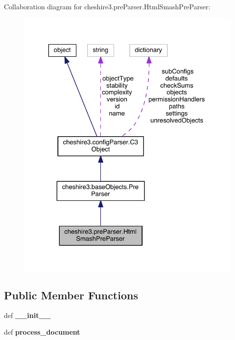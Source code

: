 Collaboration diagram for cheshire3.\-pre\-Parser.\-Html\-Smash\-Pre\-Parser\-:
\nopagebreak
\begin{figure}[H]
\begin{center}
\leavevmode
\includegraphics[width=325pt]{classcheshire3_1_1pre_parser_1_1_html_smash_pre_parser__coll__graph}
\end{center}
\end{figure}
\subsection*{Public Member Functions}
\begin{DoxyCompactItemize}
\item 
\hypertarget{classcheshire3_1_1pre_parser_1_1_html_smash_pre_parser_aaf28723a3045ac67f35668ead04bab39}{def {\bfseries \-\_\-\-\_\-init\-\_\-\-\_\-}}\label{classcheshire3_1_1pre_parser_1_1_html_smash_pre_parser_aaf28723a3045ac67f35668ead04bab39}

\item 
\hypertarget{classcheshire3_1_1pre_parser_1_1_html_smash_pre_parser_af06af59a09f336f375f01598a8fc3e8b}{def {\bfseries process\-\_\-document}}\label{classcheshire3_1_1pre_parser_1_1_html_smash_pre_parser_af06af59a09f336f375f01598a8fc3e8b}

\end{DoxyCompactItemize}
